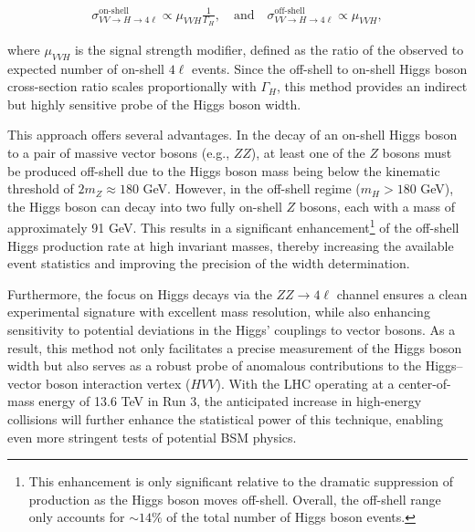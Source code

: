 \begin{equation}
\label{eq:resonant}
\begin{gathered}
\sigma^\text{on-shell}_{VV \to H \to 4\ell} \propto \mu_{VVH} \frac{1}{\Gamma_H}, 
\quad\text{and}\quad
\sigma^\text{off-shell}_{VV \to H \to 4\ell} \propto \mu_{VVH},
\end{gathered}
\end{equation}

where \( \mu_{VVH} \) is the signal strength modifier, defined as the ratio of the observed to expected number of on-shell \( 4\ell \) events. Since the off-shell to on-shell Higgs boson cross-section ratio scales proportionally with \( \Gamma_H \), this method provides an indirect but highly sensitive probe of the Higgs boson width.

This approach offers several advantages. In the decay of an on-shell Higgs boson to a pair of massive vector bosons (e.g., \( ZZ \)), at least one of the \( Z \) bosons must be produced off-shell due to the Higgs boson mass being below the kinematic threshold of \( 2m_Z \approx 180 \) GeV. However, in the off-shell regime (\( m_H > 180 \) GeV), the Higgs boson can decay into two fully on-shell \( Z \) bosons, each with a mass of approximately 91 GeV. This results in a significant enhancement\footnote{This enhancement is only significant relative to the dramatic suppression of production as the Higgs boson moves off-shell. Overall, the off-shell range only accounts for $\sim14\%$ of the total number of Higgs boson events.} of the off-shell Higgs production rate at high invariant masses, thereby increasing the available event statistics and improving the precision of the width determination.

Furthermore, the focus on Higgs decays via the \( ZZ \to 4\ell \) channel ensures a clean experimental signature with excellent mass resolution, while also enhancing sensitivity to potential deviations in the Higgs' couplings to vector bosons. As a result, this method not only facilitates a precise measurement of the Higgs boson width but also serves as a robust probe of anomalous contributions to the Higgs–vector boson interaction vertex (\( HVV \)). With the LHC operating at a center-of-mass energy of 13.6 TeV in Run 3, the anticipated increase in high-energy collisions will further enhance the statistical power of this technique, enabling even more stringent tests of potential BSM physics.


